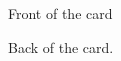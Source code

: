 \documentclass[avery5911,grid]{flashcards}
\author{Tsz Timmy Chan}
\begin{document}


\begin{flashcard}[Section]{Front of the card}
\begin{center}
Back of the card.
\end{center}
\end{flashcard}
\end{document}
